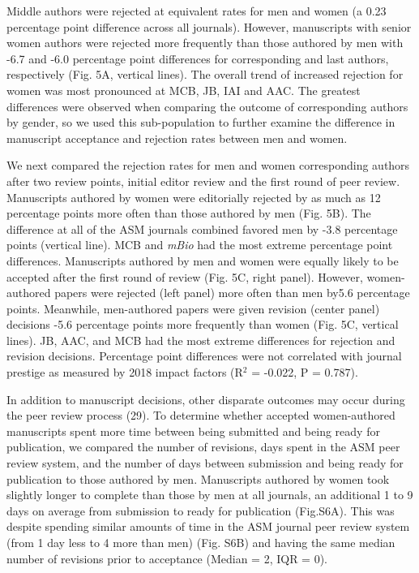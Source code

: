 \documentclass[11pt,]{article}
\begin{document}
Middle authors were rejected at equivalent rates for men and women (a
0.23 percentage point difference across all journals). However,
manuscripts with senior women authors were rejected more frequently than
those authored by men with -6.7 and -6.0 percentage point differences
for corresponding and last authors, respectively (Fig. 5A, vertical
lines). The overall trend of increased rejection for women was most
pronounced at MCB, JB, IAI and AAC. The greatest differences were
observed when comparing the outcome of corresponding authors by gender,
so we used this sub-population to further examine the difference in
manuscript acceptance and rejection rates between men and women.

We next compared the rejection rates for men and women corresponding
authors after two review points, initial editor review and the first
round of peer review. Manuscripts authored by women were editorially
rejected by as much as 12 percentage points more often than those
authored by men (Fig. 5B). The difference at all of the ASM journals
combined favored men by -3.8 percentage points (vertical line). MCB and
\emph{mBio} had the most extreme percentage point differences.
Manuscripts authored by men and women were equally likely to be accepted
after the first round of review (Fig. 5C, right panel). However,
women-authored papers were rejected (left panel) more often than men
by5.6 percentage points. Meanwhile, men-authored papers were given
revision (center panel) decisions -5.6 percentage points more frequently
than women (Fig. 5C, vertical lines). JB, AAC, and MCB had the most
extreme differences for rejection and revision decisions. Percentage
point differences were not correlated with journal prestige as measured
by 2018 impact factors (R\({^2}\) = -0.022, P = 0.787).

In addition to manuscript decisions, other disparate outcomes may occur
during the peer review process (29). To determine whether accepted
women-authored manuscripts spent more time between being submitted and
being ready for publication, we compared the number of revisions, days
spent in the ASM peer review system, and the number of days between
submission and being ready for publication to those authored by men.
Manuscripts authored by women took slightly longer to complete than
those by men at all journals, an additional 1 to 9 days on average from
submission to ready for publication (Fig.S6A). This was despite spending
similar amounts of time in the ASM journal peer review system (from 1
day less to 4 more than men) (Fig. S6B) and having the same median
number of revisions prior to acceptance (Median = 2, IQR = 0).
\end{document}
